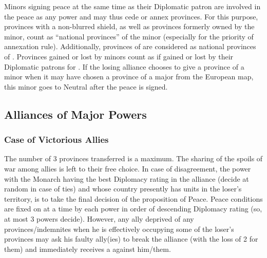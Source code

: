 \bparag Minors signing peace at the same time as their Diplomatic patron are
involved in the peace as any power and may thus cede or annex provinces.
\bparag For this purpose, provinces with a non-blurred shield, as well as
provinces formerly owned by the minor, count as ``national provinces'' of the
minor (especially for the priority of annexation rule).
\bparag Additionally, provinces of \regionBalkans are considered as national
provinces of \paysVenise.
\bparag Provinces gained or lost by minors count as if gained or lost by their
Diplomatic patrons for \VPs.
\bparag If the losing alliance chooses to give a province of a minor when it
may have chosen a province of a major from the European map, this minor goes
to Neutral after the peace is signed.



\subsection{Alliances of Major Powers}
\subsubsection{Case of Victorious Allies}
\aparag The number of 3 provinces transferred is a maximum. The sharing of the
spoils of war among allies is left to their free choice.
\aparag In case of disagreement, the power with the Monarch having the best
Diplomacy rating in the alliance (decide at random in case of ties) and whose
country presently has units in the loser's territory, is to take the final
decision of the proposition of Peace. Peace conditions are fixed on at a time
by each power in order of descending Diplomacy rating (so, at most 3 powers
decide).
\aparag However, any ally deprived of any provinces/indemnites when he is
effectively occupying some of the loser's provinces may ask his faulty
ally(ies) to break the alliance (with the loss of 2 \STAB for them) and
immediately receives a \CB against him/them.


